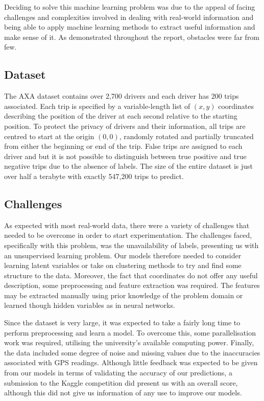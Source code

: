\documentclass[a4paper, 11pt, twocolumn]{report}
\begin{document}
Deciding to solve this machine learning problem was due to the appeal of facing challenges and complexities involved in dealing with real-world information and being able to apply machine learning methods to extract useful information and make sense of it. As demonstrated throughout the report, obstacles were far from few.

\subsection{Dataset}

The AXA dataset contains over 2,700 drivers and each driver has 200 trips associated. Each trip is specified by a variable-length list of $(x,y)$ coordinates describing the position of the driver at each second relative to the starting position. To protect the privacy of drivers and their information, all trips are centred to start at the origin $(0,0)$, randomly rotated and partially truncated from either the beginning or end of the trip. False trips are assigned to each driver and but it is not possible to distinguish between true positive and true negative trips due to the absence of labels. The size of the entire dataset is just over half a terabyte with exactly 547,200 trips to predict.

\subsection{Challenges}

As expected with most real-world data, there were a variety of challenges that needed to be overcome in order to start experimentation. The challenges faced, specifically with this problem, was the unavailability of labels, presenting us with an unsupervised learning problem. Our models therefore needed to consider learning latent variables or take on clustering methods to try and find some structure to the data. Moreover, the fact that coordinates do not offer any useful description, some preprocessing and feature extraction was required. The features may be extracted manually using prior knowledge of the problem domain or learned though hidden variables as in neural networks.

Since the dataset is very large, it was expected to take a fairly long time to perform preprocessing and learn a model. To overcome this, some parallelisation work was required, utilising the university's available computing power. Finally, the data included some degree of noise and missing values due to the inaccuracies associated with GPS readings. Although little feedback was expected to be given from our models in terms of validating the accuracy of our predictions, a submission to the Kaggle competition did present us with an overall score, although this did not give us information of any use to improve our models.
\end{document}
